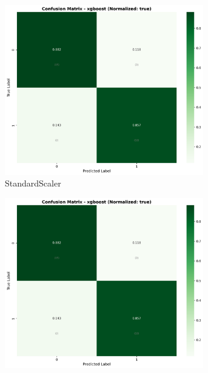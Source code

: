 \begin{figure}[H]
\centering
\begin{subfigure}[b]{0.31\textwidth}\centering
\includegraphics[width=0.95\textwidth]{Result/cleveland_dataset/confusion_matrices/xgboost_numeric_dataset_StandardScaler.png}
\caption{StandardScaler}\label{fig:xgb_clev_cm_standard}
\end{subfigure}\hfill
\begin{subfigure}[b]{0.31\textwidth}\centering
\includegraphics[width=0.95\textwidth]{Result/cleveland_dataset/confusion_matrices/xgboost_numeric_dataset_MinMaxScaler.png}

\end{subfigure}
\end{figure}
